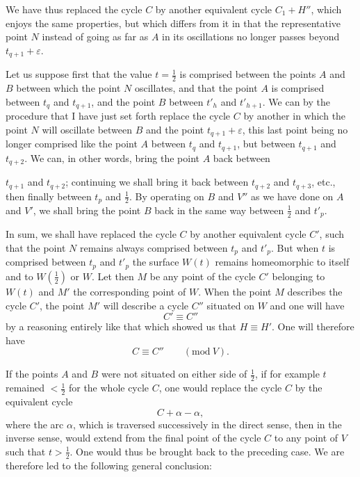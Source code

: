 \documentclass{article}
\begin{document}
We have thus replaced the cycle $C$ by another equivalent cycle $C_{1} + H''$, which enjoys the same properties, but which differs from it in that the representative point $N$ instead of going as far as $A$ in its oscillations no longer passes beyond $t_{q+1} + \varepsilon$.

Let us suppose first that the value $t = \frac{1}{2}$ is comprised between the points $A$ and $B$ between which the point $N$ oscillates, and that the point $A$ is comprised between $t_{q}$ and $t_{q+1}$, and the point $B$ between $t'_{h}$ and $t'_{h+1}$. We can by the procedure that I have just set forth replace the cycle $C$ by another in which the point $N$ will oscillate between $B$ and the point $t_{q+1} + \varepsilon$, this last point being no longer comprised like the point $A$ between $t_{q}$ and $t_{q+1}$, but between $t_{q+1}$ and $t_{q+2}$. We can, in other words, bring the point $A$ back between

$t_{q+1}$ and $t_{q+2}$; continuing we shall bring it back between $t_{q+2}$ and $t_{q+3}$, etc., then finally between $t_{p}$ and $\frac{1}{2}$. By operating on $B$ and $V''$ as we have done on $A$ and $V'$, we shall bring the point $B$ back in the same way between $\frac{1}{2}$ and $t'_{p}$.

In sum, we shall have replaced the cycle $C$ by another equivalent cycle $C'$, such that the point $N$ remains always comprised between $t_{p}$ and $t'_{p}$. But when $t$ is comprised between $t_{p}$ and $t'_{p}$ the surface $W(t)$ remains homeomorphic to itself and to $W\left(\frac{1}{2}\right)$ or $W$. Let then $M$ be any point of the cycle $C'$ belonging to $W(t)$ and $M'$ the corresponding point of $W$. When the point $M$ describes the cycle $C'$, the point $M'$ will describe a cycle $C''$ situated on $W$ and one will have
\[ C' \equiv C'' \]
by a reasoning entirely like that which showed us that $H \equiv H'$. One will therefore have
\[ C \equiv C'' \qquad (\text{mod}\ V). \]

If the points $A$ and $B$ were not situated on either side of $\frac{1}{2}$, if for example $t$ remained $< \frac{1}{2}$ for the whole cycle $C$, one would replace the cycle $C$ by the equivalent cycle
\[ C + \alpha - \alpha, \]
where the arc $\alpha$, which is traversed successively in the direct sense, then in the inverse sense, would extend from the final point of the cycle $C$ to any point of $V$ such that $t > \frac{1}{2}$. One would thus be brought back to the preceding case. We are therefore led to the following general conclusion:
\end{document}
